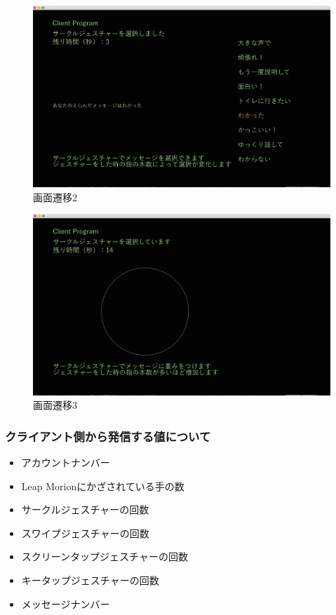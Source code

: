 \documentclass{funthesis}
\begin{document}
 \begin{figure}
  \begin{center}
  \includegraphics[width=120mm]{./img/clseni2.png}
  \end{center}
  \caption{画面遷移2}
  \label{senni2}
  \end{figure}
   \begin{figure}
  \begin{center}
  \includegraphics[width=120mm]{./img/clseni3.png}
  \end{center}
  \caption{画面遷移3}
  \label{senni3}
\end{figure}


\subsubsection{クライアント側から発信する値について}

\begin{itemize}
 \item アカウントナンバー
 \item Leap Morionにかざされている手の数
 \item サークルジェスチャーの回数
 \item スワイプジェスチャーの回数
  \item スクリーンタップジェスチャーの回数
 \item キータップジェスチャーの回数
 \item  メッセージナンバー
\end{itemize}
\end{document}
